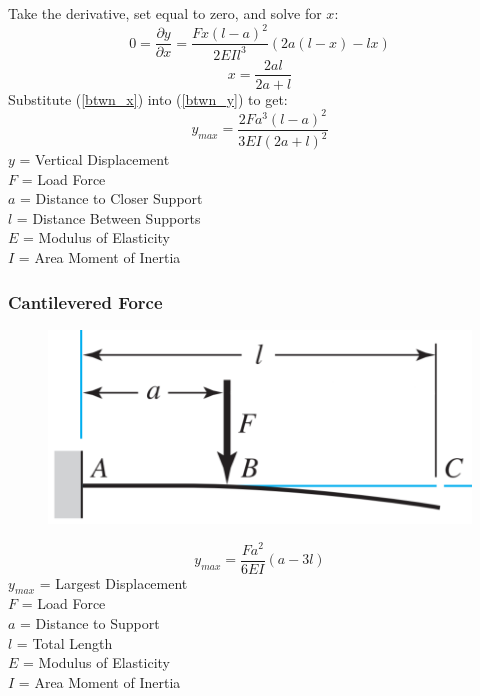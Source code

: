 \documentclass[11pt,a4paper,titlepage]{article}
\begin{document}
	Take the derivative, set equal to zero, and solve for $x$:
	\begin{equation}
		0 = \frac{\partial y}{\partial x} = \frac{F x (l-a)^2}{2 EI l^3} (2a (l-x) - lx)
	\end{equation}
	\begin{equation} \label{btwn_x}
		x = \frac{2al}{2a + l}
	\end{equation}
	Substitute (\ref{btwn_x}) into (\ref{btwn_y}) to get:
	\begin{equation}
		y_{max} = \frac{2 F a^3 (l-a)^2}{3 EI (2a+l)^2}
	\end{equation}
	$y$ = Vertical Displacement \\
	$F$ = Load Force \\
	$a$ = Distance to Closer Support \\
	$l$ = Distance Between Supports \\
	$E$ = Modulus of Elasticity \\
	$I$ = Area Moment of Inertia
	
	\subsubsection{Cantilevered Force}
	\begin{figure}[H]
		\centering
		\includegraphics[width=0.7\linewidth]{"Cantilievered_Force"}
	\end{figure}
	
	\begin{equation}
		y_{max} = \frac{F a^2}{6 EI} (a-3l)
	\end{equation}
	$y_{max}$ = Largest Displacement \\
	$F$ = Load Force \\
	$a$ = Distance to Support \\
	$l$ = Total Length \\
	$E$ = Modulus of Elasticity \\
	$I$ = Area Moment of Inertia
	
\end{document}
